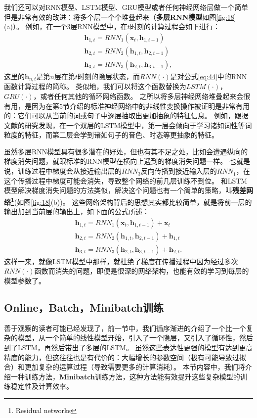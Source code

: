 \documentclass[10pt,a4paper]{ctexart}
\begin{document}
我们还可以对RNN模型、LSTM模型、GRU模型或者任何神经网络层做一个简单但是非常有效的改进：将多个层一个个堆叠起来（\textbf{多层RNN模型}如图\ref{fig:18}(a)）。
例如，在一个3层RNN模型中，在$t$时刻的计算过程会如下进行：
\[
 \begin{array}{l}
 \textbf{h}_{1,t} = RNN_1 (\textbf{x}_t,\textbf{h}_{1,t-1}) \\
 \textbf{h}_{2,t} = RNN_2 (\textbf{h}_{1,t},\textbf{h}_{2,t-1}) \\
 \textbf{h}_{3,t} = RNN_3 (\textbf{h}_{2,t},\textbf{h}_{3,t-1}),
 \end{array}
\]
这里的$\textbf{h}_{n,t}$是第$n$层在第$t$时刻的隐层状态，而$RNN(\cdot)$是对公式\ref{eq:44}中的RNN函数计算过程的简称。
类似地，我们可以将这个函数替换为$LSTM(\cdot)$，$GRU(\cdot)$，或者任何其他的循环网络函数。
之所以将多层神经网络堆叠起来会很有用，是因为在第5节介绍的标准神经网络中的非线性变换操作被证明是非常有用的：它们可以从当前的词或句子中逐层抽取出更加抽象的特征信息。
例如，跟据文献\cite{shi2016does}的研究发现，在一个双层的LSTM模型中，第一层会倾向于学习诸如词性等词粒度的特征，而第二层会学到诸如句子的音色、时态等更抽象的特征。

虽然多层RNN模型具有很多潜在的好处，但也有其不足之处，比如会遭遇纵向的梯度消失问题，就跟标准的RNN模型在横向上遇到的梯度消失问题一样。
也就是说，训练过程中梯度会从接近输出层的$RNN_3$反向传播到接近输入层的$RNN_1$，在这个传播过程中梯度可能会消失，导致整个网络的前几层训练不到位。
和LSTM模型解决梯度消失问题的方法类似，解决这个问题也有一个简单的策略，叫\textbf{残差网络\footnote{Residual networks}}(如图\ref{fig:18}(b))\cite{he2016deep}。
这些网络架构背后的思想其实都比较简单，就是将前一层的输出加到当前层的输出上，如下面的公式所述：
\[
 \begin{array}{l}
 \textbf{h}_{1,t} = RNN_1 (\textbf{x}_t,\textbf{h}_{1,t-1}) + \textbf{x}_t \\
 \textbf{h}_{2,t} = RNN_2 (\textbf{h}_{1,t},\textbf{h}_{2,t-1}) + \textbf{h}_{1,t} \\
 \textbf{h}_{3,t} = RNN_3 (\textbf{h}_{2,t},\textbf{h}_{3,t-1}) + \textbf{h}_{2,t}.
 \end{array}
\]
这样一来，就像LSTM模型中那样，就杜绝了梯度在传播过程中因为经过多次$RNN(\cdot)$函数而消失的问题，即便是很深的网络架构，也能有效的学习到每层的模型参数了。

\subsection{Online，Batch，Minibatch训练}
善于观察的读者可能已经发现了，前一节中，我们循序渐进的介绍了一个比一个复杂的模型，从一个简单的线性模型开始，引入了一个隐层，又引入了循环性，然后到了LSTM，再然后带出了多层的LSTM。
虽然这些表达性更强的模型有达到更高精度的能力，但这往往也是有代价的：大幅增长的参数空间（极有可能导致过拟合）和更加复杂的运算过程（导致需要更多的计算消耗）。
本节内容中，我们将介绍一种训练方法，\textbf{Minibatch}训练方法，这种方法能有效提升这些复杂模型的训练稳定性及计算效率。
\end{document}
